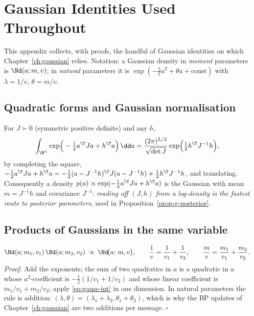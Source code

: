 \chapter{Gaussian Identities Used Throughout}\label{app:gauss}

This appendix collects, with proofs, the handful of Gaussian identities on
which Chapter~\ref{ch:gaussian} relies. Notation: a Gaussian
density in \emph{moment} parameters is $\Nd(a; m, v)$; in \emph{natural}
parameters it is
$\exp(-\tfrac{\lambda}{2} a^2 + \theta a + \mathrm{const})$ with
$\lambda = 1/v$, $\theta = m/v$.

\section{Quadratic forms and Gaussian normalisation}

For $J \succ 0$ (symmetric positive definite) and any $h$,
\begin{equation}
  \int_{\R^L} \exp\!\Big( -\tfrac{1}{2} a^\T J a + h^\T a \Big)\, \dd a
  = \frac{(2\pi)^{L/2}}{\sqrt{\det J}}
    \exp\!\Big( \tfrac{1}{2} h^\T J^{-1} h \Big),
  \label{eq:gauss-int}
\end{equation}
by completing the square, $-\tfrac{1}{2}a^\T J a + h^\T a =
-\tfrac{1}{2}(a - J^{-1}h)^\T J (a - J^{-1}h) + \tfrac{1}{2} h^\T J^{-1}h$,
and translating. Consequently a density
$p(a) \propto \exp(-\tfrac{1}{2} a^\T J a + h^\T a)$ is the Gaussian with
mean $m = J^{-1} h$ and covariance $J^{-1}$: \emph{reading off $(J, h)$
from a log-density is the fastest route to posterior parameters}, used in
Proposition~\ref{prop:g-posterior}.

\section{Products of Gaussians in the same variable}

\begin{equation}
  \Nd(a; m_1, v_1)\, \Nd(a; m_2, v_2)
  \;\propto\; \Nd\!\big(a;\, m, v\big),
  \qquad
  \frac{1}{v} = \frac{1}{v_1} + \frac{1}{v_2},
  \qquad
  \frac{m}{v} = \frac{m_1}{v_1} + \frac{m_2}{v_2}.
  \label{eq:gauss-product}
\end{equation}
\emph{Proof.} Add the exponents; the sum of two quadratics in $a$ is a
quadratic in $a$ whose $a^2$-coefficient is
$-\tfrac{1}{2}(1/v_1 + 1/v_2)$ and whose linear coefficient is
$m_1/v_1 + m_2/v_2$; apply \eqref{eq:gauss-int} in one dimension. In
natural parameters the rule is addition:
$(\lambda, \theta) = (\lambda_1 + \lambda_2, \theta_1 + \theta_2)$,
which is why the BP updates of Chapter~\ref{ch:gaussian} are two
additions per message. $\square$

